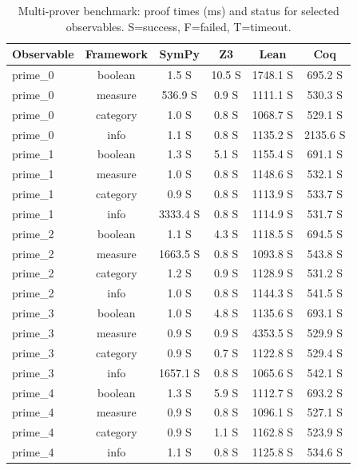 
\begin{table}[htbp]
\centering
\caption{Multi‑prover benchmark: proof times (ms) and status for selected observables.
         S=success, F=failed, T=timeout.}
\label{tab:benchmark}
\begin{tabular}{l c c c c c}
\toprule
\textbf{Observable} & \textbf{Framework} & \textbf{SymPy} & \textbf{Z3} & \textbf{Lean} & \textbf{Coq} \\
\midrule
prime_0 & boolean & 1.5 S & 10.5 S & 1748.1 S & 695.2 S \\
prime_0 & measure & 536.9 S & 0.9 S & 1111.1 S & 530.3 S \\
prime_0 & category & 1.0 S & 0.8 S & 1068.7 S & 529.1 S \\
prime_0 & info & 1.1 S & 0.8 S & 1135.2 S & 2135.6 S \\
prime_1 & boolean & 1.3 S & 5.1 S & 1155.4 S & 691.1 S \\
prime_1 & measure & 1.0 S & 0.8 S & 1148.6 S & 532.1 S \\
prime_1 & category & 0.9 S & 0.8 S & 1113.9 S & 533.7 S \\
prime_1 & info & 3333.4 S & 0.8 S & 1114.9 S & 531.7 S \\
prime_2 & boolean & 1.1 S & 4.3 S & 1118.5 S & 694.5 S \\
prime_2 & measure & 1663.5 S & 0.8 S & 1093.8 S & 543.8 S \\
prime_2 & category & 1.2 S & 0.9 S & 1128.9 S & 531.2 S \\
prime_2 & info & 1.0 S & 0.8 S & 1144.3 S & 541.5 S \\
prime_3 & boolean & 1.0 S & 4.8 S & 1135.6 S & 693.1 S \\
prime_3 & measure & 0.9 S & 0.9 S & 4353.5 S & 529.9 S \\
prime_3 & category & 0.9 S & 0.7 S & 1122.8 S & 529.4 S \\
prime_3 & info & 1657.1 S & 0.8 S & 1065.6 S & 542.1 S \\
prime_4 & boolean & 1.3 S & 5.9 S & 1112.7 S & 693.2 S \\
prime_4 & measure & 0.9 S & 0.8 S & 1096.1 S & 527.1 S \\
prime_4 & category & 0.9 S & 1.1 S & 1162.8 S & 523.9 S \\
prime_4 & info & 1.1 S & 0.8 S & 1125.8 S & 534.6 S \\

\bottomrule
\end{tabular}
\end{table}
